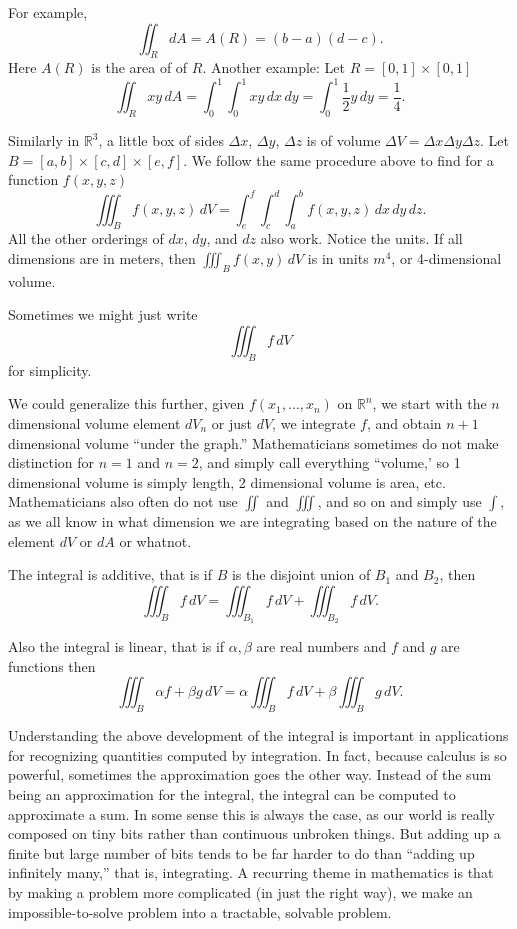 \documentclass[11pt]{article}
\newcommand{\R}{{\mathbb{R}}}
\begin{document}
For example,
$$
\iint_R dA = A(R) = (b-a)(d-c) .
$$
Here $A(R)$ is the area of of $R$.  Another example:  Let $R = [0,1] \times [0,1]$
$$
\iint_R xy\, dA =
\int_0^1 \int_0^1 xy \, dx \, dy
=
\int_0^1 \frac{1}{2} y \, dy
= \frac{1}{4}.
$$

Similarly in $\R^3$, a little box of sides $\Delta x$, $\Delta y$, $\Delta z$
is of volume $\Delta V = \Delta x \Delta y \Delta z$.  
Let $B = [a,b] \times [c,d] \times [e,f]$.
We follow the same procedure above to find for a function $f(x,y,z)$
$$
\iiint_B f(x,y,z) \, dV
=
\int_e^f \int_c^d \int_a^b f(x,y,z) \, dx \, dy \, dz .
$$
All the other orderings of $dx$, $dy$, and $dz$ also work.
Notice the units.  If all dimensions are in meters, then
$\iiint_B f(x,y) \, dV$ is in units $m^4$, or 4-dimensional volume.

Sometimes we might just write
$$
\iiint_B f \, dV
$$
for simplicity.

We could generalize this further, given $f(x_1,\ldots,x_n)$ on $\R^n$, we start with
the $n$ dimensional volume element $dV_n$ or just $dV$, we integrate $f$, and obtain
$n+1$ dimensional volume ``under the graph.''
Mathematicians sometimes do not make distinction for $n=1$ and $n=2$, and simply call
everything ``volume,' so 1 dimensional volume is simply length, 2 dimensional volume is
area, etc.
Mathematicians also often do not use $\iint$ and $\iiint$,
and so on and simply use $\int$,
as we all know in what dimension we are integrating based on the nature of
the element $dV$ or $dA$ or whatnot.

The integral is additive, that is if $B$ is the disjoint union of $B_1$ and $B_2$,
then
$$
\iiint_B f \, dV = 
\iiint_{B_1} f \, dV +
\iiint_{B_2} f \, dV .
$$

Also the integral is linear, that is if $\alpha, \beta$ are real numbers and
$f$ and $g$ are functions then
$$
\iiint_B \alpha f + \beta g \, dV = 
\alpha \iiint_B f \, dV +
\beta \iiint_B g \, dV .
$$

Understanding the above development of the integral is important
in applications for recognizing quantities computed by integration.
In fact, because calculus is
so powerful, sometimes the approximation goes the other way.
Instead of the sum being an approximation for the integral, the integral can be
computed to approximate a sum.
In some sense this is always the case, as our world is
really composed on tiny bits rather than continuous unbroken things.
But adding up a finite but large number of bits tends to be far harder to do than
``adding up infinitely many,'' that is, integrating.
A recurring theme in mathematics is that by making a problem more complicated
(in just the right way), we make an impossible-to-solve problem
into a tractable, solvable problem.
\end{document}
